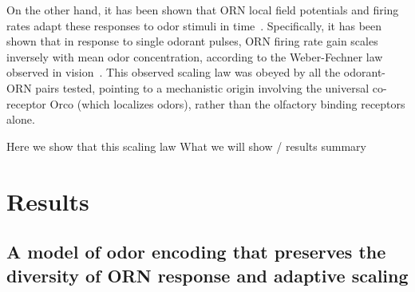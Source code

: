 On the other hand, it has been shown that ORN local field potentials and firing rates adapt these responses to odor stimuli in time~\cite{martelli, srinivas_elife, cao_WL}. Specifically, it has been shown that in response to single odorant pulses, ORN firing rate gain scales inversely with mean odor concentration, according to the Weber-Fechner law observed in vision~\cite{srinivas_elife}. This observed scaling law was obeyed by all the odorant-ORN pairs tested, pointing to a mechanistic origin involving the universal co-receptor Orco (which localizes odors), rather than the olfactory binding receptors alone.

Here we show that this scaling law  {\color{blue} What we will show / results summary}




\section{Results}






\subsection{A model of odor encoding that preserves the diversity of ORN response and adaptive scaling}


